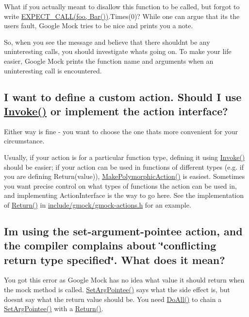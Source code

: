What if you actually meant to disallow this function to be called, but forgot to write {\ttfamily \hyperlink{gmock-spec-builders_8h_a535a6156de72c1a2e25a127e38ee5232}{E\+X\+P\+E\+C\+T\+\_\+\+C\+A\+L\+L(foo, Bar())}.Times(0)}? While one can argue that it\textquotesingle{}s the user\textquotesingle{}s fault, Google Mock tries to be nice and prints you a note.

So, when you see the message and believe that there shouldn\textquotesingle{}t be any uninteresting calls, you should investigate what\textquotesingle{}s going on. To make your life easier, Google Mock prints the function name and arguments when an uninteresting call is encountered.

\subsection*{I want to define a custom action. Should I use \hyperlink{namespacetesting_a12aebaf8363d49a383047529f798b694}{Invoke()} or implement the action interface?}

Either way is fine -\/ you want to choose the one that\textquotesingle{}s more convenient for your circumstance.

Usually, if your action is for a particular function type, defining it using {\ttfamily \hyperlink{namespacetesting_a12aebaf8363d49a383047529f798b694}{Invoke()}} should be easier; if your action can be used in functions of different types (e.\+g. if you are defining {\ttfamily Return(value)}), {\ttfamily \hyperlink{namespacetesting_a36bd06c5ea972c6df0bd9f40a7a94c65}{Make\+Polymorphic\+Action()}} is easiest. Sometimes you want precise control on what types of functions the action can be used in, and implementing {\ttfamily Action\+Interface} is the way to go here. See the implementation of {\ttfamily \hyperlink{namespacetesting_af6d1c13e9376c77671e37545cd84359c}{Return()}} in {\ttfamily \hyperlink{gmock-actions_8h}{include/gmock/gmock-\/actions.\+h}} for an example.

\subsection*{I\textquotesingle{}m using the set-\/argument-\/pointee action, and the compiler complains about \char`\"{}conflicting return type specified\char`\"{}. What does it mean?}

You got this error as Google Mock has no idea what value it should return when the mock method is called. {\ttfamily \hyperlink{namespacetesting_a5740a5033b88c37666fcd09a269d123f}{Set\+Arg\+Pointee()}} says what the side effect is, but doesn\textquotesingle{}t say what the return value should be. You need {\ttfamily \hyperlink{namespacetesting_a5f533932753d2af95000e96c4a3042e3}{Do\+All()}} to chain a {\ttfamily \hyperlink{namespacetesting_a5740a5033b88c37666fcd09a269d123f}{Set\+Arg\+Pointee()}} with a {\ttfamily \hyperlink{namespacetesting_af6d1c13e9376c77671e37545cd84359c}{Return()}}.

